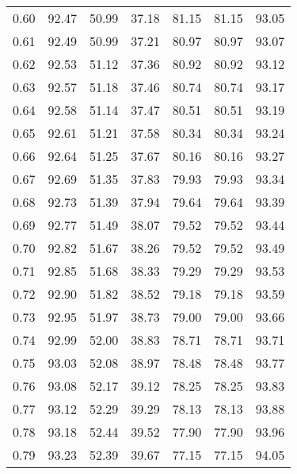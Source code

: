 \begin{tabular}{|c|c|c|c|c|c|c|}
      0.60 &     92.47 &     50.99 &      37.18 &   81.15 &      81.15 &         93.05 \\
      0.61 &     92.49 &     50.99 &      37.21 &   80.97 &      80.97 &         93.07 \\
      0.62 &     92.53 &     51.12 &      37.36 &   80.92 &      80.92 &         93.12 \\
      0.63 &     92.57 &     51.18 &      37.46 &   80.74 &      80.74 &         93.17 \\
      0.64 &     92.58 &     51.14 &      37.47 &   80.51 &      80.51 &         93.19 \\
      0.65 &     92.61 &     51.21 &      37.58 &   80.34 &      80.34 &         93.24 \\
      0.66 &     92.64 &     51.25 &      37.67 &   80.16 &      80.16 &         93.27 \\
      0.67 &     92.69 &     51.35 &      37.83 &   79.93 &      79.93 &         93.34 \\
      0.68 &     92.73 &     51.39 &      37.94 &   79.64 &      79.64 &         93.39 \\
      0.69 &     92.77 &     51.49 &      38.07 &   79.52 &      79.52 &         93.44 \\
      0.70 &     92.82 &     51.67 &      38.26 &   79.52 &      79.52 &         93.49 \\
      0.71 &     92.85 &     51.68 &      38.33 &   79.29 &      79.29 &         93.53 \\
      0.72 &     92.90 &     51.82 &      38.52 &   79.18 &      79.18 &         93.59 \\
      0.73 &     92.95 &     51.97 &      38.73 &   79.00 &      79.00 &         93.66 \\
      0.74 &     92.99 &     52.00 &      38.83 &   78.71 &      78.71 &         93.71 \\
      0.75 &     93.03 &     52.08 &      38.97 &   78.48 &      78.48 &         93.77 \\
      0.76 &     93.08 &     52.17 &      39.12 &   78.25 &      78.25 &         93.83 \\
      0.77 &     93.12 &     52.29 &      39.29 &   78.13 &      78.13 &         93.88 \\
      0.78 &     93.18 &     52.44 &      39.52 &   77.90 &      77.90 &         93.96 \\
      0.79 &     93.23 &     52.39 &      39.67 &   77.15 &      77.15 &         94.05 \\

\end{tabular}
